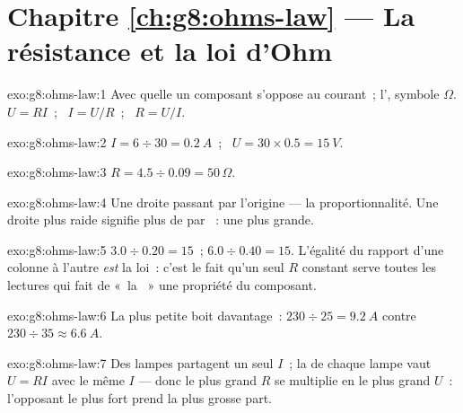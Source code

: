 \section*{Chapitre \ref{ch:g8:ohms-law} --- La résistance et la loi d'Ohm}

\begin{solution}{exo:g8:ohms-law:1}
Avec quelle  un composant s'oppose au courant~;  l',
symbole $\Omega$. $U = R I$~; \ $I = U/R$~; \ $R = U/I$.
\end{solution}

\begin{solution}{exo:g8:ohms-law:2}
$I = 6 \div 30 = \qty{0.2}{A}$~; \ $U = 30 \times 0.5 =
\qty{15}{V}$.
\end{solution}

\begin{solution}{exo:g8:ohms-law:3}
$R = 4.5 \div 0.09 = 50\,\Omega$.
\end{solution}

\begin{solution}{exo:g8:ohms-law:4}
Une droite passant par l'origine --- la proportionnalité. Une droite
plus raide signifie plus de  par ~: une  plus
grande.
\end{solution}

\begin{solution}{exo:g8:ohms-law:5}
$3.0 \div 0.20 = 15$~; $6.0 \div 0.40 = 15$. L'égalité du rapport
d'une colonne à l'autre \emph{est} la loi~: c'est le fait qu'un seul
$R$ constant serve toutes les lectures qui fait de «~la ~»
une propriété du composant.
\end{solution}

\begin{solution}{exo:g8:ohms-law:6}
La plus petite  boit davantage~:
$230 \div 25 = \qty{9.2}{A}$ contre
$230 \div 35 \approx \qty{6.6}{A}$.
\end{solution}

\begin{solution}{exo:g8:ohms-law:7}
Des lampes  partagent un seul $I$~; la  de chaque
lampe vaut $U = R I$ avec le même $I$ --- donc le plus grand $R$ se
multiplie en le plus grand $U$~: l'opposant le plus fort prend la
plus grosse part.
\end{solution}

